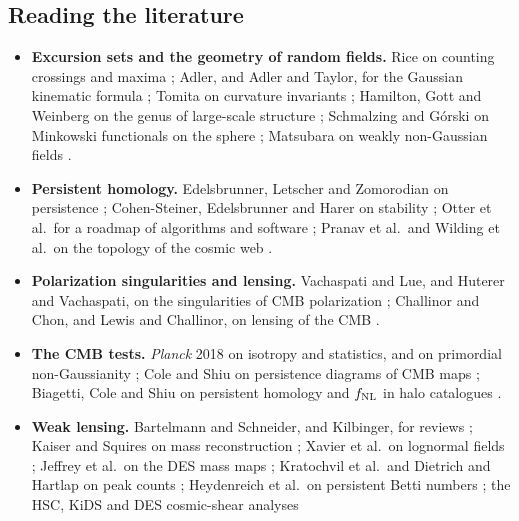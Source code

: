 \subsection*{Reading the literature}
\label{12c:sec:reading}

\begin{itemize}[itemsep=2pt,leftmargin=1.2em]
  \item \textbf{Excursion sets and the geometry of random fields.} Rice on counting crossings and maxima \cite{Rice1944}; Adler, and Adler
        and Taylor, for the Gaussian kinematic formula \cite{Adler1981,AdlerTaylor2007}; Tomita on curvature invariants \cite{Tomita1986};
        Hamilton, Gott and Weinberg on the genus of large-scale structure \cite{HamiltonGottWeinberg1986}; Schmalzing and G\'orski on
        Minkowski functionals on the sphere \cite{SchmalzingGorski1998}; Matsubara on weakly non-Gaussian fields \cite{Matsubara2003}.
  \item \textbf{Persistent homology.} Edelsbrunner, Letscher and Zomorodian on persistence \cite{Edelsbrunner2002}; Cohen-Steiner,
        Edelsbrunner and Harer on stability \cite{CohenSteiner2007}; Otter et al.\ for a roadmap of algorithms and software \cite{Otter2017};
        Pranav et al.\ and Wilding et al.\ on the topology of the cosmic web \cite{Pranav2017,Wilding2021}.
  \item \textbf{Polarization singularities and lensing.} Vachaspati and Lue, and Huterer and Vachaspati, on the singularities of CMB
        polarization \cite{VachaspatiLue2003,HutererVachaspati2005}; Challinor and Chon, and Lewis and Challinor, on lensing of the CMB
        \cite{ChallinorChon2002,LewisChallinor2006}.
  \item \textbf{The CMB tests.} \textit{Planck} 2018 on isotropy and statistics, and on primordial non-Gaussianity
        \cite{Planck2018VII,Planck2018IX}; Cole and Shiu on persistence diagrams of CMB maps \cite{ColeShiu2018}; Biagetti, Cole and Shiu
        on persistent homology and $f_{\rm NL}$ in halo catalogues \cite{Biagetti2021}.
  \item \textbf{Weak lensing.} Bartelmann and Schneider, and Kilbinger, for reviews \cite{BartelmannSchneider2001,Kilbinger2015}; Kaiser and
        Squires on mass reconstruction \cite{KaiserSquires1993}; Xavier et al.\ on lognormal fields \cite{Xavier2016}; Jeffrey et al.\ on the DES
        mass maps \cite{Jeffrey2021DESmass}; Kratochvil et al.\ and Dietrich and Hartlap on peak counts \cite{Kratochvil2010,DietrichHartlap2010};
        Heydenreich et al.\ on persistent Betti numbers \cite{Heydenreich2021}; the HSC, KiDS and DES cosmic-shear analyses

\end{itemize}
